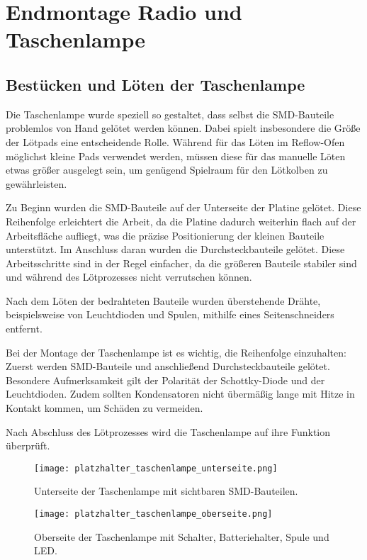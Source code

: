 \section{Endmontage Radio und Taschenlampe}

\subsection{Bestücken und Löten der Taschenlampe}
Die Taschenlampe wurde speziell so gestaltet, dass selbst die SMD-Bauteile problemlos von Hand gelötet werden können. Dabei spielt insbesondere die Größe der Lötpads eine entscheidende Rolle. Während für das Löten im Reflow-Ofen möglichst kleine Pads verwendet werden, müssen diese für das manuelle Löten etwas größer ausgelegt sein, um genügend Spielraum für den Lötkolben zu gewährleisten.

Zu Beginn wurden die SMD-Bauteile auf der Unterseite der Platine gelötet. Diese Reihenfolge erleichtert die Arbeit, da die Platine dadurch weiterhin flach auf der Arbeitsfläche aufliegt, was die präzise Positionierung der kleinen Bauteile unterstützt. Im Anschluss daran wurden die Durchsteckbauteile gelötet. Diese Arbeitsschritte sind in der Regel einfacher, da die größeren Bauteile stabiler sind und während des Lötprozesses nicht verrutschen können.

Nach dem Löten der bedrahteten Bauteile wurden überstehende Drähte, beispielsweise von Leuchtdioden und Spulen, mithilfe eines Seitenschneiders entfernt.

Bei der Montage der Taschenlampe ist es wichtig, die Reihenfolge einzuhalten: Zuerst werden SMD-Bauteile und anschließend Durchsteckbauteile gelötet. Besondere Aufmerksamkeit gilt der Polarität der Schottky-Diode und der Leuchtdioden. Zudem sollten Kondensatoren nicht übermäßig lange mit Hitze in Kontakt kommen, um Schäden zu vermeiden.

Nach Abschluss des Lötprozesses wird die Taschenlampe auf ihre Funktion überprüft.

\begin{figure}[h!]
    \centering
    \texttt{[image: platzhalter\_taschenlampe\_unterseite.png]}
    \caption{Unterseite der Taschenlampe mit sichtbaren SMD-Bauteilen.}
    \label{fig:taschenlampe_unterseite}
\end{figure}

\begin{figure}[h!]
    \centering
    \texttt{[image: platzhalter\_taschenlampe\_oberseite.png]}
    \caption{Oberseite der Taschenlampe mit Schalter, Batteriehalter, Spule und LED.}
    \label{fig:taschenlampe_oberseite}
\end{figure}

